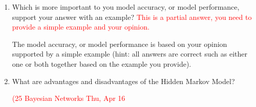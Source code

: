 \documentclass[12pt]{article}
\newenvironment{QandA}{\begin{enumerate}[label=\bfseries\arabic*.]\bfseries}
{\end{enumerate}}
\newenvironment{answered}{\par\normalfont\color{Sepia}}{}
\begin{document}
\begin{QandA}
    \item Which is more important to you \textemdash{} model accuracy, or model
    performance, support your answer with an example? \textcolor{red}{This is a
    partial answer, you need to provide a simple example and your
    opinion.}
    \begin{answered} 
        The model accuracy, or model performance is based on your
        opinion supported by a simple example (hint: all answers are
        correct such as either one or both together based on the
        example you provide).
    \end{answered}

    \item What are advantages and disadvantages of the Hidden Markov Model?
    \begin{answered}
        \textcolor{red}{(25 Bayesian Networks \textemdash{} Thu, Apr 16}
    \end{answered}
\end{QandA}
\end{document}
